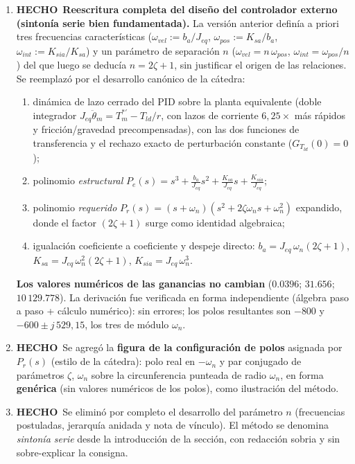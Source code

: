 \documentclass[11pt,a4paper]{article}
\newcommand{\hecho}{\textcolor{okgreen}{\textbf{HECHO}}}
\begin{document}
\begin{enumerate}[label=\textbf{P\arabic*.}, leftmargin=1.3cm]
  \item \hecho\ \textbf{Reescritura completa del diseño del controlador externo (sintonía serie bien fundamentada).} La versión anterior definía a priori tres frecuencias características ($\omega_{vel}:=b_a/J_{eq}$, $\omega_{pos}:=K_{sa}/b_a$, $\omega_{int}:=K_{sia}/K_{sa}$) y un parámetro de separación $n$ ($\omega_{vel}=n\,\omega_{pos}$, $\omega_{int}=\omega_{pos}/n$) del que luego se deducía $n=2\zeta+1$, sin justificar el origen de las relaciones. Se reemplazó por el desarrollo canónico de la cátedra:
  \begin{enumerate}[label=(\roman*)]
      \item dinámica de lazo cerrado del PID sobre la planta equivalente (doble integrador $J_{eq}\ddot\theta_m = T_m^{*\prime} - T_{ld}/r$, con lazos de corriente $6{,}25\times$ más rápidos y fricción/gravedad precompensadas), con las dos funciones de transferencia y el rechazo exacto de perturbación constante ($G_{T_{ld}}(0)=0$);
      \item polinomio \emph{estructural} $P_e(s) = s^3+\frac{b_a}{J_{eq}}s^2+\frac{K_{sa}}{J_{eq}}s+\frac{K_{sia}}{J_{eq}}$;
      \item polinomio \emph{requerido} $P_r(s)=(s+\omega_n)(s^2+2\zeta\omega_n s+\omega_n^2)$ expandido, donde el factor $(2\zeta+1)$ surge como identidad algebraica;
      \item igualación coeficiente a coeficiente y despeje directo: $b_a=J_{eq}\,\omega_n(2\zeta+1)$, $K_{sa}=J_{eq}\,\omega_n^2(2\zeta+1)$, $K_{sia}=J_{eq}\,\omega_n^3$.
  \end{enumerate}
  \textbf{Los valores numéricos de las ganancias no cambian} ($0{.}0396$; $31{.}656$; $10\,129{.}778$). La derivación fue verificada en forma independiente (álgebra paso a paso + cálculo numérico): sin errores; los polos resultantes son $-800$ y $-600\pm j\,529{,}15$, los tres de módulo $\omega_n$.
  \item \hecho\ Se agregó la \textbf{figura de la configuración de polos} asignada por $P_r(s)$ (estilo de la cátedra): polo real en $-\omega_n$ y par conjugado de parámetros $\zeta$, $\omega_n$ sobre la circunferencia punteada de radio $\omega_n$, en forma \textbf{genérica} (sin valores numéricos de los polos), como ilustración del método.
  \item \hecho\ Se eliminó por completo el desarrollo del parámetro $n$ (frecuencias postuladas, jerarquía anidada y nota de vínculo). El método se denomina \emph{sintonía serie} desde la introducción de la sección, con redacción sobria y sin sobre-explicar la consigna.

\end{enumerate}
\end{document}
